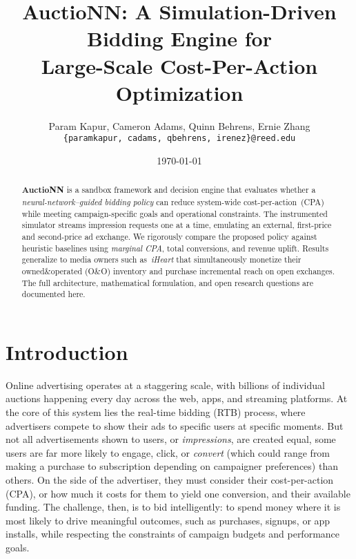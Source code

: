 \documentclass[11pt]{article}
\title{\bfseries AuctioNN: A Simulation-Driven Bidding Engine for\\
Large-Scale Cost-Per-Action Optimization}
\author{Param Kapur, Cameron Adams, Quinn Behrens, Ernie Zhang \\
\texttt{\{paramkapur, cadams, qbehrens, irenez\}@reed.edu}\\}
\date{\today}
\begin{document}
\maketitle
\vspace{-1em}

\begin{abstract}
  \noindent
  \textbf{AuctioNN} is a sandbox framework and decision engine that
  evaluates whether a \emph{neural-network–guided bidding policy} can
  reduce system-wide cost-per-action~(CPA) while meeting
  campaign-specific goals and operational constraints.  The
  instrumented simulator streams impression requests one at a time,
  emulating an external, first-price and second-price ad exchange.
  We rigorously
  compare the proposed policy against heuristic baselines using
  \emph{marginal CPA}, total conversions, and revenue uplift.
  Results generalize to media owners such as~\emph{iHeart} that
  simultaneously monetize their owned\&operated (O\&O) inventory and
  purchase incremental reach on open exchanges.  The full
  architecture, mathematical formulation, and open research questions
  are documented here. %
\end{abstract}

\section{Introduction}

Online advertising operates at a staggering scale, with billions of individual auctions happening every day across the web, apps, and streaming platforms. At the core of this system lies the real-time bidding (RTB) process, where advertisers compete to show their ads to specific users at specific moments. But not all advertisements shown to users, or \textit{impressions}, are created equal, some users are far more likely to engage, click, or \textit{convert} (which could range from making a purchase to subscription depending on campaigner preferences) than others. On the side of the advertiser, they must consider their cost-per-action (CPA), or how much it costs for them to yield one conversion, and their available funding. The challenge, then, is to bid intelligently: to spend money where it is most likely to drive meaningful outcomes, such as purchases, signups, or app installs, while respecting the constraints of campaign budgets and performance goals. 
\end{document}

